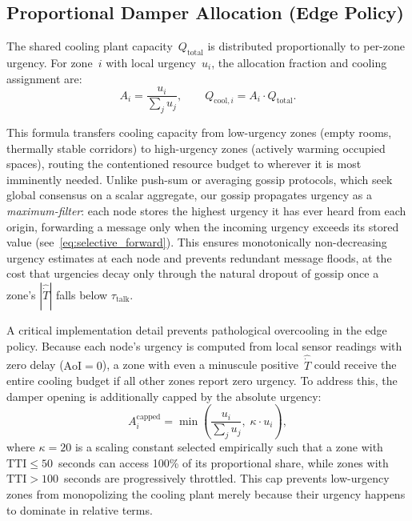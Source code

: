 \documentclass[conference]{IEEEtran}
\begin{document}
\subsection{Proportional Damper Allocation (Edge Policy)}

The shared cooling plant capacity~$Q_{\text{total}}$ is distributed proportionally to per-zone urgency. For zone~$i$ with local urgency~$u_i$, the allocation fraction and cooling assignment are:
\begin{equation}
    A_i = \frac{u_i}{\displaystyle\sum_{j} u_j}, \qquad Q_{\text{cool},i} = A_i \cdot Q_{\text{total}}.
    \label{eq:proportional_allocation}
\end{equation}

This formula transfers cooling capacity from low-urgency zones (empty rooms,
thermally stable corridors) to high-urgency zones (actively warming occupied
spaces), routing the contentioned resource budget to wherever it is most
imminently needed.  Unlike push-sum or averaging gossip protocols, which seek
global consensus on a scalar aggregate, our gossip propagates urgency as a
\emph{maximum-filter}: each node stores the highest urgency it has ever heard
from each origin, forwarding a message only when the incoming urgency
exceeds its stored value (see~\eqref{eq:selective_forward}).  This ensures
monotonically non-decreasing urgency estimates at each node and prevents
redundant message floods, at the cost that urgencies decay only through the
natural dropout of gossip once a zone's $|\hat{\dot{T}}|$ falls below
$\tau_{\text{talk}}$.

A critical implementation detail prevents pathological overcooling in the edge policy. Because each node's urgency is computed from local sensor readings with zero delay ($\text{AoI} = 0$), a zone with even a minuscule positive~$\hat{\dot{T}}$ could receive the entire cooling budget if all other zones report zero urgency. To address this, the damper opening is additionally capped by the absolute urgency:
\begin{equation}
    A_i^{\text{capped}} = \min\!\left(\frac{u_i}{\displaystyle\sum_{j} u_j},\; \kappa \cdot u_i\right),
    \label{eq:urgency_cap}
\end{equation}
where $\kappa = 20$ is a scaling constant selected empirically such that a zone with $\text{TTI} \leq 50$~seconds can access 100\% of its proportional share, while zones with $\text{TTI} > 100$~seconds are progressively throttled. This cap prevents low-urgency zones from monopolizing the cooling plant merely because their urgency happens to dominate in relative terms.
\end{document}
